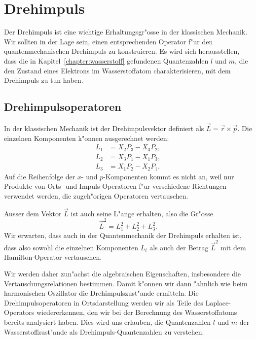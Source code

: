 \chapter{Drehimpuls\label{chapter:drehimpuls}}
\rhead{}
Der Drehimpuls ist eine wichtige Erhaltungsgr"osse in der klassischen
Mechanik. Wir sollten in der Lage sein, einen entsprechenden Operator
f"ur den quantenmechanischen Drehimpuls zu konstruieren.
Es wird sich herausstellen, dass die in Kapitel~\ref{chapter:wasserstoff}
gefundenen Quantenzahlen $l$ und $m$, die
den Zustand eines Elektrons im Wasserstoffatom charakterisieren, mit
dem Drehimpuls zu tun haben.

%
%

\section{Drehimpulsoperatoren\label{section:drehimpulsoperatoren}}
In der klassischen Mechanik ist der Drehimpulsvektor definiert
als $\vec L=\vec r\times \vec p$. Die einzelnen Komponenten k"onnen
ausgerechnet werden:
\begin{align*}
L_1&=X_2P_3-X_3P_2,\\
L_2&=X_3P_1-X_1P_3,\\
L_3&=X_1P_2-X_2P_1.
\end{align*}
%
Auf die Reihenfolge der $x$- und $p$-Komponenten kommt es nicht an,
weil nur Produkte von Orts- und Impuls-Operatoren f"ur verschiedene
Richtungen verwendet werden, die zugeh"origen Operatoren vertauschen.

Ausser dem Vektor $\vec L$ ist auch seine L"ange erhalten, also
die Gr"osse
\[
\vec L^2=L_1^2+L_2^2+L_3^2.
\]
%
Wir erwarten, dass auch in der Quantenmechanik der Drehimpuls
erhalten ist, dass also sowohl die einzelnen Komponenten $L_i$ 
als auch der Betrag $\vec L^2$ mit dem Hamilton-Operator vertauschen.

Wir werden daher zun"achst die algebraischen Eigenschaften, insbesondere
die Vertauschungsrelationen bestimmen. Damit k"onnen wir dann "ahnlich
wie beim harmonischen Oszillator die Dreh\-impuls\-zust"ande ermitteln.
Die Drehimpulsoperatoren in Ortsdarstellung werden wir als Teile
des Laplace-Operators wiedererkennen, den wir bei der Berechnung
des Wasserstoffatoms bereits analysiert haben. Dies wird uns erlauben,
die Quantenzahlen $l$ und $m$ der Wasserstoffzust"ande als
Drehimpuls-Quantenzahlen zu verstehen.

